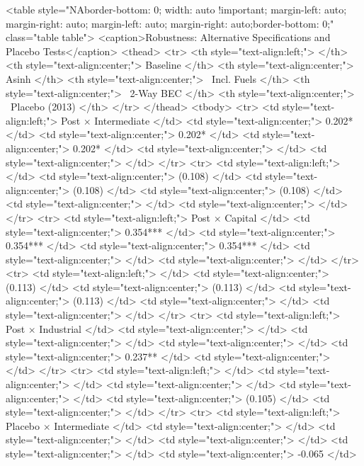 <table style="NAborder-bottom: 0; width: auto !important; margin-left: auto; margin-right: auto; margin-left: auto; margin-right: auto;border-bottom: 0;" class="table table">
<caption>Robustness: Alternative Specifications and Placebo Tests</caption>
 <thead>
  <tr>
   <th style="text-align:left;">   </th>
   <th style="text-align:center;"> Baseline </th>
   <th style="text-align:center;"> Asinh </th>
   <th style="text-align:center;">  Incl. Fuels </th>
   <th style="text-align:center;">  2-Way BEC </th>
   <th style="text-align:center;">  Placebo (2013) </th>
  </tr>
 </thead>
<tbody>
  <tr>
   <td style="text-align:left;"> Post $\times$ Intermediate </td>
   <td style="text-align:center;"> 0.202* </td>
   <td style="text-align:center;"> 0.202* </td>
   <td style="text-align:center;"> 0.202* </td>
   <td style="text-align:center;">  </td>
   <td style="text-align:center;">  </td>
  </tr>
  <tr>
   <td style="text-align:left;">  </td>
   <td style="text-align:center;"> (0.108) </td>
   <td style="text-align:center;"> (0.108) </td>
   <td style="text-align:center;"> (0.108) </td>
   <td style="text-align:center;">  </td>
   <td style="text-align:center;">  </td>
  </tr>
  <tr>
   <td style="text-align:left;"> Post $\times$ Capital </td>
   <td style="text-align:center;"> 0.354*** </td>
   <td style="text-align:center;"> 0.354*** </td>
   <td style="text-align:center;"> 0.354*** </td>
   <td style="text-align:center;">  </td>
   <td style="text-align:center;">  </td>
  </tr>
  <tr>
   <td style="text-align:left;">  </td>
   <td style="text-align:center;"> (0.113) </td>
   <td style="text-align:center;"> (0.113) </td>
   <td style="text-align:center;"> (0.113) </td>
   <td style="text-align:center;">  </td>
   <td style="text-align:center;">  </td>
  </tr>
  <tr>
   <td style="text-align:left;"> Post $\times$ Industrial </td>
   <td style="text-align:center;">  </td>
   <td style="text-align:center;">  </td>
   <td style="text-align:center;">  </td>
   <td style="text-align:center;"> 0.237** </td>
   <td style="text-align:center;">  </td>
  </tr>
  <tr>
   <td style="text-align:left;">  </td>
   <td style="text-align:center;">  </td>
   <td style="text-align:center;">  </td>
   <td style="text-align:center;">  </td>
   <td style="text-align:center;"> (0.105) </td>
   <td style="text-align:center;">  </td>
  </tr>
  <tr>
   <td style="text-align:left;"> Placebo $\times$ Intermediate </td>
   <td style="text-align:center;">  </td>
   <td style="text-align:center;">  </td>
   <td style="text-align:center;">  </td>
   <td style="text-align:center;">  </td>
   <td style="text-align:center;"> -0.065 </td>
